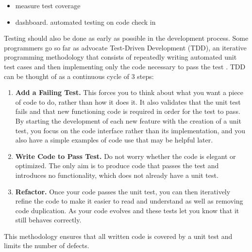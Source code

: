 \documentclass[ChapterTOCs,krantz2]{krantz} %
\begin{document}
\begin{itemize}
\item measure test coverage
\item dashboard. automated testing on code check in
\end{itemize}

Testing should also be done as early as possible in the development process.
Some programmers go so far as advocate Test-Driven Development (TDD), an
iterative programming methodology that consists of repeatedly writing automated
unit test cases and then implementing only the code necessary to pass the test
\cite{Bec02, Ast03}.  TDD can be thought of as a continuous cycle of 3 steps:

\begin{enumerate}

\item {\bf Add a Failing Test.} This forces you to think about what you want a
piece of code to do, rather than how it does it.  It also validates that the
unit test fails and that new functioning code is required in order for the test
to pass. By starting the development of each new feature with the creation of a
unit test, you focus on the code interface rather than its implementation, and
you also have a simple examples of code use that may be helpful later.

\item {\bf Write Code to Pass Test.} Do not worry whether the code is elegant or
optimized. The only aim is to produce code that passes the test and introduces
no functionality, which does not already have a unit test.

\item {\bf Refactor.} Once your code passes the unit test, you can then iteratively
refine the code to make it easier to read and understand as well as removing code
duplication. As your code evolves and these tests let you know that it still
behaves correctly.

\end{enumerate}

This methodology ensures that all written code is covered by a unit test and
limits the number of defects.
\end{document}
